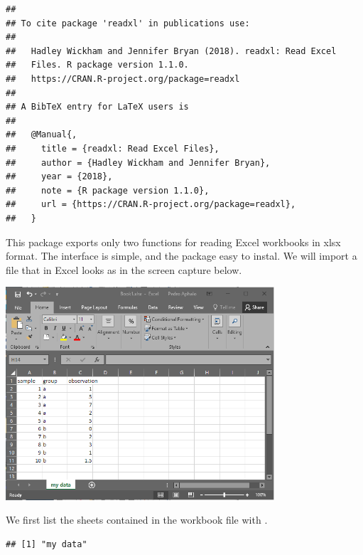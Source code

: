 \documentclass[krantz2]{krantz}\usepackage{knitr}%
\begin{document}
\begin{knitrout}\footnotesize
{}\color{fgcolor}\begin{kframe}
\begin{alltt}
\hlstd{(} \hlstd{=} \hlstd{)}
\end{alltt}
\begin{verbatim}
## 
## To cite package 'readxl' in publications use:
## 
##   Hadley Wickham and Jennifer Bryan (2018). readxl: Read Excel
##   Files. R package version 1.1.0.
##   https://CRAN.R-project.org/package=readxl
## 
## A BibTeX entry for LaTeX users is
## 
##   @Manual{,
##     title = {readxl: Read Excel Files},
##     author = {Hadley Wickham and Jennifer Bryan},
##     year = {2018},
##     note = {R package version 1.1.0},
##     url = {https://CRAN.R-project.org/package=readxl},
##   }
\end{verbatim}
\end{kframe}
\end{knitrout}

This package exports only two functions for reading Excel workbooks in xlsx format. The interface is simple, and the package easy to instal. We will import a file that in Excel looks as in the screen capture below.

\begin{center}
\includegraphics[width=0.75\textwidth]{figures/Book1-xlsx.png}
\end{center}

We first list the sheets contained in the workbook file with .
\begin{knitrout}\footnotesize
{}\color{fgcolor}\begin{kframe}
\begin{alltt}
 \hlkwb{<-} \hlstd{(}\hlstd{)}
\end{alltt}
\begin{verbatim}
## [1] "my data"
\end{verbatim}
\end{kframe}
\end{knitrout}
\end{document}
